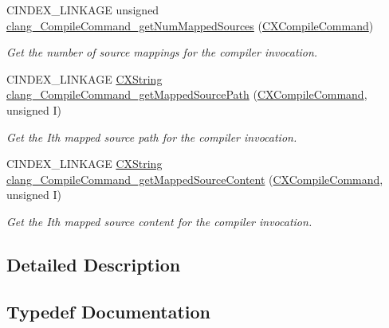 \begin{DoxyCompactItemize}
\mbox{\label{group__COMPILATIONDB_ga28b373614893bffe6ae3f7c53ef8a851}} 
C\+I\+N\+D\+E\+X\+\_\+\+L\+I\+N\+K\+A\+GE unsigned \mbox{\hyperlink{group__COMPILATIONDB_ga28b373614893bffe6ae3f7c53ef8a851}{clang\+\_\+\+Compile\+Command\+\_\+get\+Num\+Mapped\+Sources}} (\mbox{\hyperlink{group__COMPILATIONDB_gae59272595ab7fa4c1ed03348c56264bf}{C\+X\+Compile\+Command}})
\begin{DoxyCompactList}\small\item\em Get the number of source mappings for the compiler invocation. \end{DoxyCompactList}\item 
\mbox{\label{group__COMPILATIONDB_ga968b688446fb07e3409cbdbf2fe66027}} 
C\+I\+N\+D\+E\+X\+\_\+\+L\+I\+N\+K\+A\+GE \mbox{\hyperlink{structCXString}{C\+X\+String}} \mbox{\hyperlink{group__COMPILATIONDB_ga968b688446fb07e3409cbdbf2fe66027}{clang\+\_\+\+Compile\+Command\+\_\+get\+Mapped\+Source\+Path}} (\mbox{\hyperlink{group__COMPILATIONDB_gae59272595ab7fa4c1ed03348c56264bf}{C\+X\+Compile\+Command}}, unsigned I)
\begin{DoxyCompactList}\small\item\em Get the I\textquotesingle{}th mapped source path for the compiler invocation. \end{DoxyCompactList}\item 
\mbox{\label{group__COMPILATIONDB_gae22f9bce5ef1e2bc430218ed85e20e1f}} 
C\+I\+N\+D\+E\+X\+\_\+\+L\+I\+N\+K\+A\+GE \mbox{\hyperlink{structCXString}{C\+X\+String}} \mbox{\hyperlink{group__COMPILATIONDB_gae22f9bce5ef1e2bc430218ed85e20e1f}{clang\+\_\+\+Compile\+Command\+\_\+get\+Mapped\+Source\+Content}} (\mbox{\hyperlink{group__COMPILATIONDB_gae59272595ab7fa4c1ed03348c56264bf}{C\+X\+Compile\+Command}}, unsigned I)
\begin{DoxyCompactList}\small\item\em Get the I\textquotesingle{}th mapped source content for the compiler invocation. \end{DoxyCompactList}\end{DoxyCompactItemize}


\subsection{Detailed Description}


\subsection{Typedef Documentation}
\mbox{\label{group__COMPILATIONDB_gaecfc6e98d321bc436061472f4e4f84b2}} 
